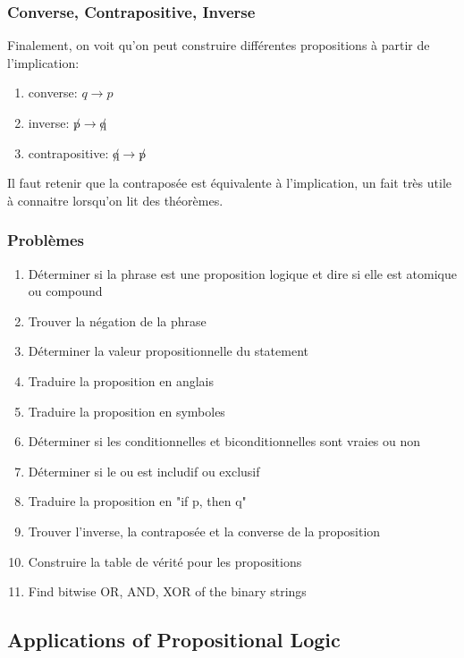 \documentclass{article}
\begin{document}
\subsubsection{Converse, Contrapositive, Inverse}

Finalement, on voit qu'on peut construire différentes propositions à partir
de l'implication:
\begin{enumerate}
    \item converse: $ q \rightarrow p $
    \item inverse: $ \not p \rightarrow \not q$
    \item contrapositive: $\not q \rightarrow \not p $
\end{enumerate}

Il faut retenir que la contraposée est équivalente à l'implication, un
fait très utile à connaitre lorsqu'on lit des théorèmes.

\subsubsection{Problèmes}
\begin{enumerate}
    \item Déterminer si la phrase est une proposition logique et dire si
	elle est atomique ou compound
    \item Trouver la négation de la phrase
    \item Déterminer la valeur propositionnelle du statement
    \item Traduire la proposition en anglais
    \item Traduire la proposition en symboles
    \item Déterminer si les conditionnelles et biconditionnelles sont
	vraies ou non
    \item Déterminer si le ou est includif ou exclusif
    \item Traduire la proposition en "if p, then q"
    \item Trouver l'inverse, la contraposée et la converse de la proposition
    \item Construire la table de vérité pour les propositions
    \item Find bitwise OR, AND, XOR of the binary strings
\end{enumerate}

\subsection{Applications of Propositional Logic}
\end{document}
